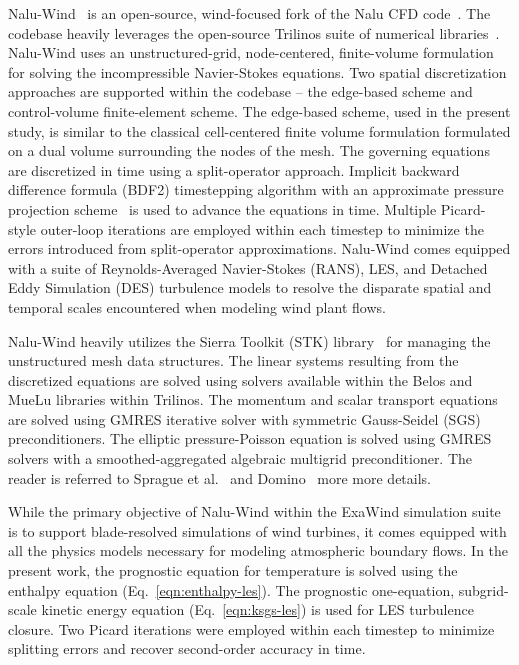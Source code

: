Nalu-Wind~\cite{SpragueAVR2020} is an open-source, wind-focused fork of the Nalu CFD
code~\cite{Domino:2015}. The codebase heavily leverages the open-source Trilinos
suite of numerical libraries~\cite{Heroux:2003}. Nalu-Wind uses an
unstructured-grid, node-centered, finite-volume formulation for solving the incompressible
Navier-Stokes equations. Two spatial discretization approaches are supported
within the codebase -- the edge-based scheme and control-volume finite-element
scheme. The edge-based scheme, used in the present study, is similar to the
classical cell-centered finite volume formulation formulated on a dual volume
surrounding the nodes of the mesh. The governing equations are discretized in
time using a split-operator approach. Implicit backward difference formula
(BDF2) timestepping algorithm with an approximate pressure projection
scheme~\cite{Moen-Domino:2003} is used to advance the equations in time.
Multiple Picard-style outer-loop iterations are employed within each timestep
to minimize the errors introduced from split-operator approximations. Nalu-Wind
comes equipped with a suite of Reynolds-Averaged Navier-Stokes (RANS), LES, and
Detached Eddy Simulation (DES) turbulence models to resolve the disparate
spatial and temporal scales encountered when modeling wind plant flows.

Nalu-Wind heavily utilizes the Sierra Toolkit (STK) library~\cite{Edwards:2010}
for managing the unstructured mesh data structures. The linear systems resulting
from the discretized equations are solved using solvers available within the
Belos and MueLu libraries within Trilinos. The momentum and scalar transport
equations are solved using GMRES iterative solver with symmetric Gauss-Seidel
(SGS) preconditioners. The elliptic pressure-Poisson equation is solved using
GMRES solvers with a smoothed-aggregated algebraic multigrid preconditioner. The
reader is referred to Sprague et al.~\cite{SpragueAVR2020} and
Domino~\cite{Domino:2015} more more details.

While the primary objective of Nalu-Wind within the ExaWind simulation suite is
to support blade-resolved simulations of wind turbines, it comes equipped
with all the physics models necessary for modeling atmospheric boundary flows.
In the present work, the prognostic equation for temperature is solved using the
enthalpy equation (Eq.~\ref{eqn:enthalpy-les}). The prognostic one-equation,
subgrid-scale kinetic energy equation (Eq.~\ref{eqn:ksgs-les}) is used for LES
turbulence closure. Two Picard iterations were employed within each timestep to
minimize splitting errors and recover second-order accuracy in time.

